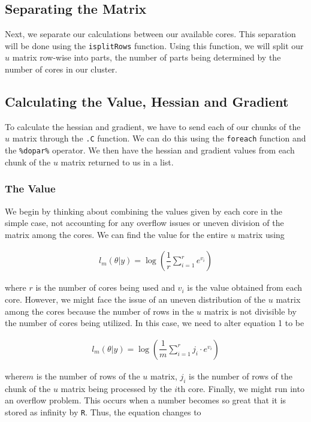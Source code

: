 \documentclass{article}
\begin{document}
\subsection{Separating the Matrix}
Next, we separate our calculations between our available cores. This separation will be done using the \texttt{isplitRows} function. Using this function, we will split our $u$ matrix row-wise into parts, the number of parts being determined by the number of cores in our cluster.

\subsection{Calculating the Value, Hessian and Gradient}
To calculate the hessian and gradient, we have to send each of our chunks of the $u$ matrix through the \texttt{.C} function. We can do this using the \texttt{foreach} function and the \texttt{\%dopar\%} operator. We then have the hessian and gradient values from each chunk of the $u$ matrix returned to us in a list.

\subsubsection{The Value}
We begin by thinking about combining the values given by each core in the simple case, not accounting for any overflow issues or uneven division of the matrix among the cores. We can find the value for the entire $u$ matrix using

\begin{align}
l_m(\theta|y) = \log(\dfrac{1}{r}\sum\limits_{i=1}^r e^{v_i})
\end{align}

\noindent where $r$ is the number of cores being used and $v_i$ is the value obtained from each core. However, we might face the issue of an uneven distribution of the $u$ matrix among the cores because the number of rows in the $u$ matrix is not divisible by the number of cores being utilized. In this case, we need to alter equation 1 to be

\begin{align}
l_m(\theta|y) = \log(\dfrac{1}{m}\sum\limits_{i=1}^r j_i \cdot e^{v_i})
\end{align}

\noindent where$m$ is the number of rows of the $u$ matrix, $j_i$ is the number of rows of the chunk of the $u$ matrix being processed by the $i$th core. Finally, we might run into an overflow problem. This occurs when a number becomes so great that it is stored as infinity by \texttt{R}. Thus, the equation changes to 
\end{document}

